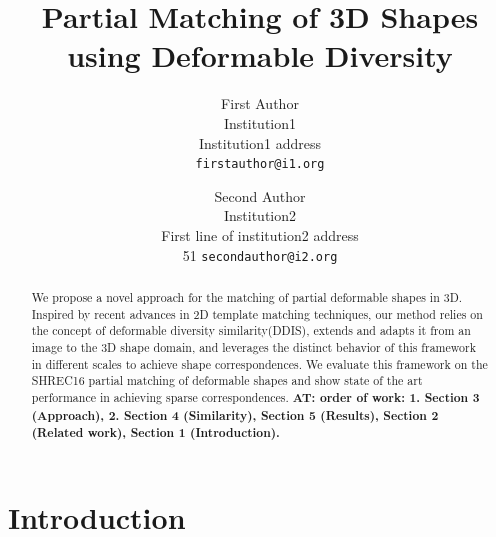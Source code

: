 \documentclass[10pt,twocolumn,letterpaper]{article}
\newcommand{\colornote}[3]{{\color{#1}\bf{#2: #3}\normalfont}}
\newcommand{\colornote}[3]{}
\newcommand {\ayellet}[1]{\colornote{blue}{AT}{#1}}
\begin{document}
\title{Partial Matching of 3D Shapes using Deformable Diversity}

\author{First Author\\
Institution1\\
Institution1 address\\
{\tt\small firstauthor@i1.org}
\and
Second Author\\
Institution2\\
First line of institution2 address\\
51
{\tt\small secondauthor@i2.org}
}

\maketitle

\begin{abstract}
We propose a novel approach for the matching of partial deformable shapes in 3D. Inspired by recent advances in 2D template matching techniques, our method relies on the concept of deformable diversity similarity(DDIS), extends and adapts it from an image to the 3D shape domain, and leverages the distinct behavior of this framework in different scales to achieve shape correspondences. We evaluate this framework on the SHREC16 partial matching of deformable shapes and show state of the art performance in achieving sparse correspondences.
\ayellet{order of work: 1. Section 3 (Approach), 2. Section 4 (Similarity), Section 5 (Results), Section 2 (Related work), Section 1 (Introduction).
}
{\color{cyan}{\bf Currently only Section 3 is sort of done}}
\end{abstract}

\section{Introduction}
\end{document}
